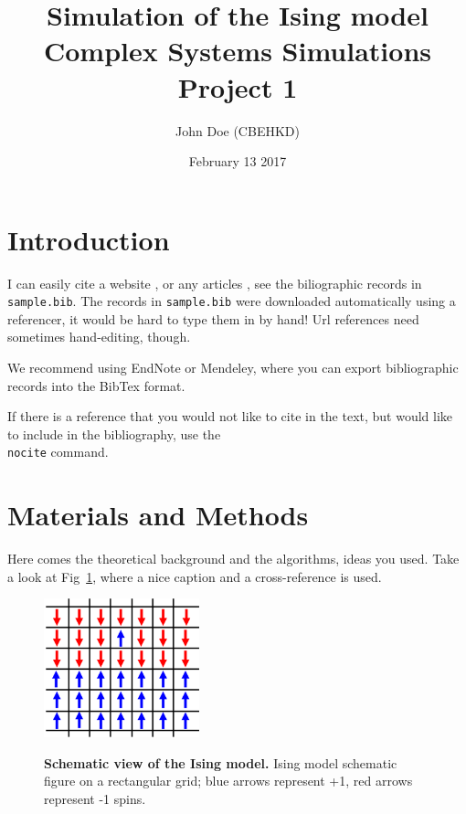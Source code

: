 \documentclass[a4paper,11pt,pdftex]{article}
\title{Simulation of the Ising model \\ \large Complex Systems Simulations Project 1}
\author{John Doe (CBEHKD)}
\date{February 13 2017}
\begin{document}
\pagestyle{fancy}

\maketitle

\tableofcontents

\section{Introduction}

I can easily cite a website \cite{leip}, or any articles \cite{Llorente2015}, see the biliographic records in \texttt{sample.bib}. The records in \texttt{sample.bib} were downloaded automatically using a referencer, it would be hard to type them in by hand! Url references need sometimes hand-editing, though.

We recommend using EndNote or Mendeley, where you can export bibliographic records into the BibTex format.

If there is a reference that you would not like to cite in the text, but would like to include in the bibliography, use the \texttt{\\nocite} command.

\section{Materials and Methods}

Here comes the theoretical background and the algorithms, ideas you used. Take a look at Fig~\ref{fig:ising}, where a nice caption and a cross-reference is used.

\begin{figure}[h!]
 \begin{center}
  \includegraphics[width=0.4\textwidth]{ising.png}
  \label{fig:ising}
  \caption{\textbf{Schematic view of the Ising model.} Ising model schematic figure on a rectangular grid; blue arrows represent +1, red arrows represent -1 spins.}
 \end{center}

\end{figure}
\end{document}
